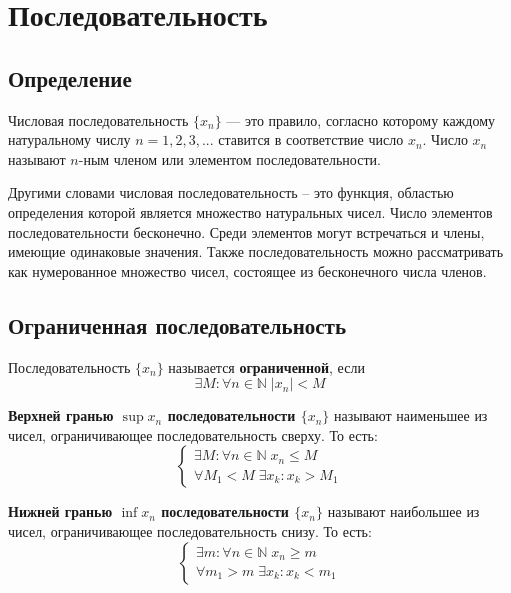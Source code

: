 \documentclass[a4paper,12pt,oneside]{extbook}
\theoremstyle{numbered}
\theoremstyle{unnumbered}
\theoremstyle{named}
\theoremstyle{unnumbered}
\theoremstyle{named}
\theoremstyle{named}
\theoremstyle{named}
\begin{document}
\section{Последовательность}%
\label{sec:Последовательность}

\subsection{Определение}%
\label{sub:Определение}

\begin{siderules}
    Числовая последовательность \(\{x_n\}\) — это правило, согласно которому каждому натуральному числу \(n = 1, 2, 3, ...\) ставится в соответствие число \(x_n\). Число \(x_n\) называют \(n\)-ным членом или элементом последовательности.
\end{siderules}

Другими словами числовая последовательность – это функция, областью определения которой является множество натуральных чисел. Число элементов последовательности бесконечно. Среди элементов могут встречаться и члены, имеющие одинаковые значения. Также последовательность можно рассматривать как нумерованное множество чисел, состоящее из бесконечного числа членов.

\subsection{Ограниченная последовательность}%
\label{sub:Ограниченная последовательность}

\begin{siderules}
    Последовательность \(\{x_n\}\) называется \textbf{ограниченной}, если
    \[
        \exists M: \forall n \in \mathbb{N} \; |x_n| < M
    \]
\end{siderules}

\begin{siderules}
    \textbf{Верхней гранью \(\sup x_n\) последовательности \(\{x_n\}\)} называют наименьшее из чисел, ограничивающее последовательность сверху. То есть:
    \[
        \begin{cases}
            \exists M: \forall n \in \mathbb{N} \; x_n \leq M \\
            \forall M_1 < M \; \exists x_k: x_k > M_1
        \end{cases}
    \]
\end{siderules}

\begin{siderules}
    \textbf{Нижней гранью \(\inf x_n\) последовательности \(\{x_n\}\)} называют наибольшее из чисел, ограничивающее последовательность снизу. То есть:
    \[
        \begin{cases}
            \exists m: \forall n \in \mathbb{N} \; x_n \geq m \\
            \forall m_1 > m \; \exists x_k: x_k < m_1
        \end{cases}
    \]
\end{siderules}
\end{document}

